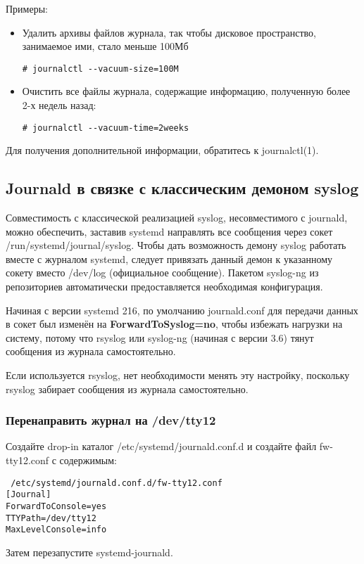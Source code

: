 \documentclass[a4paper,10pt,twoside]{article}
\begin{document}
Примеры:
\begin{itemize}
 \item Удалить архивы файлов журнала, так чтобы дисковое пространство, занимаемое ими, стало меньше 100Мб
\begin{verbatim}
# journalctl --vacuum-size=100M
\end{verbatim} 
\item Очистить все файлы журнала, содержащие информацию, полученную более 2-х недель назад:
\begin{verbatim}
# journalctl --vacuum-time=2weeks
\end{verbatim} 
\end{itemize}

Для получения дополнительной информации, обратитесь к journalctl(1).

\subsection{Journald в связке с классическим демоном syslog}
Совместимость с классической реализацией syslog, несовместимого с journald, можно обеспечить, заставив systemd направлять все сообщения через сокет /run/systemd/journal/syslog. Чтобы дать возможность демону syslog работать вместе с журналом systemd, следует привязать данный демон к указанному сокету вместо /dev/log (официальное сообщение). Пакетом syslog-ng из репозиториев автоматически предоставляется необходимая конфигурация.

Начиная с версии systemd 216, по умолчанию journald.conf для передачи данных в сокет был изменён на \textbf{ForwardToSyslog=no}, чтобы избежать нагрузки на систему, потому что rsyslog или syslog-ng (начиная с версии 3.6) тянут сообщения из журнала самостоятельно.

Если используется rsyslog, нет необходимости менять эту настройку, поскольку rsyslog забирает сообщения из журнала самостоятельно.

\subsubsection{Перенаправить журнал на /dev/tty12}
Создайте drop-in каталог /etc/systemd/journald.conf.d и создайте файл fw-tty12.conf с содержимым:

\begin{verbatim}
 /etc/systemd/journald.conf.d/fw-tty12.conf
[Journal]
ForwardToConsole=yes
TTYPath=/dev/tty12
MaxLevelConsole=info
\end{verbatim} 
Затем перезапустите systemd-journald.
\end{document}
